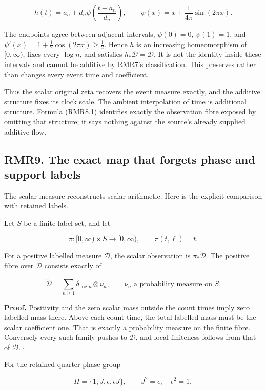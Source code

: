 \[
h(t)=a_n+d_n\psi\left(\frac{t-a_n}{d_n}\right),
\qquad
\psi(x)=x+\frac{1}{4\pi}\sin(2\pi x).
\tag{RMR8.1}
\]

The endpoints agree between adjacent intervals, \(\psi(0)=0\),
\(\psi(1)=1\), and \(\psi'(x)=1+\tfrac12\cos(2\pi x)\ge\tfrac12\). Hence
\(h\) is an increasing homeomorphism of \([0,\infty)\), fixes every
\(\log n\), and satisfies \(h_*\mathcal D=\mathcal D\). It is not the
identity inside these intervals and cannot be additive by RMR7's
classification. This preserves rather than changes every event time and
coefficient.

Thus the scalar original zeta recovers the event measure exactly, and
the additive structure fixes its clock scale. The ambient interpolation
of time is additional structure. Formula (RMR8.1) identifies exactly the
observation fibre exposed by omitting that structure; it says nothing
against the source's already supplied additive flow.

\subsection{RMR9. The exact map that forgets phase and support
labels}\label{rmr9.-the-exact-map-that-forgets-phase-and-support-labels}

The scalar measure reconstructs scalar arithmetic. Here is the explicit
comparison with retained labels.

Let \(S\) be a finite label set, and let

\[
\pi:[0,\infty)\times S\longrightarrow[0,\infty),\qquad
\pi(t,\ell)=t.
\tag{RMR9.1}
\]

For a positive labelled measure \(\widetilde{\mathcal D}\), the scalar
observation is \(\pi_*\widetilde{\mathcal D}\). The positive fibre over
\(\mathcal D\) consists exactly of

\[
\widetilde{\mathcal D}
=\sum_{n\ge1}\delta_{\log n}\otimes\nu_n,
\qquad
\nu_n\text{ a probability measure on }S.
\tag{RMR9.2}
\]

\textbf{Proof.} Positivity and the zero scalar mass outside the count
times imply zero labelled mass there. Above each count time, the total
labelled mass must be the scalar coefficient one. That is exactly a
probability measure on the finite fibre. Conversely every such family
pushes to \(\mathcal D\), and local finiteness follows from that of
\(\mathcal D\). \(\square\)

For the retained quarter-phase group

\[
H=\{1,J,\epsilon,\epsilon J\},\qquad
J^2=\epsilon,\quad \epsilon^2=1,
\]

